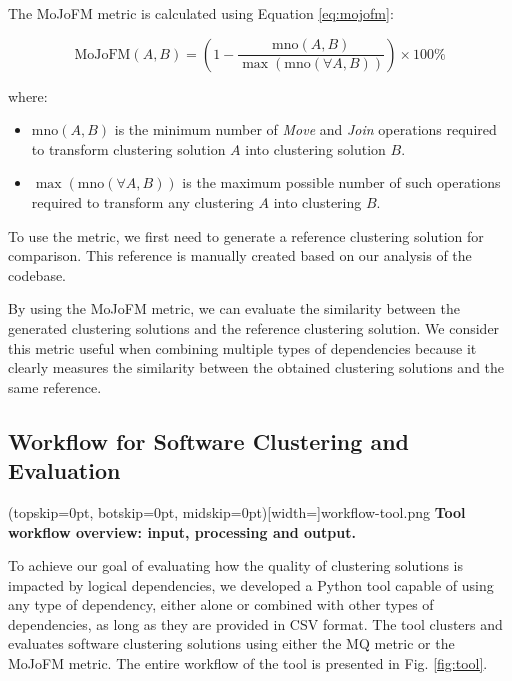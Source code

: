 \documentclass{ieeeaccess}
\begin{document}
The MoJoFM metric is calculated using Equation \eqref{eq:mojofm}:

\begin{equation} 
\text{MoJoFM}(A, B) = \left(1 - \frac{\text{mno}(A, B)}{\max(\text{mno}(\forall A, B))}\right) \times 100\%
\label{eq:mojofm}
\end{equation}

where:

\begin{itemize}
    \item $\text{mno}(A, B)$ is the minimum number of \textit{Move} and \textit{Join} operations required to transform clustering solution $A$ into clustering solution $B$.
    \item $\max(\text{mno}(\forall A, B))$ is the maximum possible number of such operations required to transform any clustering $A$ into clustering $B$.
\end{itemize}

To use the metric, we first need to generate a reference clustering solution for comparison. This reference is manually created based on our analysis of the codebase.

By using the MoJoFM metric, we can evaluate the similarity between the generated clustering solutions and the reference clustering solution. We consider this metric useful when combining multiple types of dependencies because it clearly measures the similarity between the obtained clustering solutions and the same reference.


\subsection{Workflow for Software Clustering and Evaluation}
\label{subsec:tool_workflow}

\Figure[t!](topskip=0pt, botskip=0pt, midskip=0pt)[width=\textwidth]{workflow-tool.png}
{ \textbf{Tool workflow overview: input, processing and output.}\label{fig:tool}}

To achieve our goal of evaluating how the quality of clustering solutions is impacted by logical dependencies, we developed a Python tool capable of using any type of dependency, either alone or combined with other types of dependencies, as long as they are provided in CSV format. The tool clusters and evaluates software clustering solutions using either the MQ metric or the MoJoFM metric.  The entire workflow of the tool is presented in Fig. \ref{fig:tool}.
\end{document}
